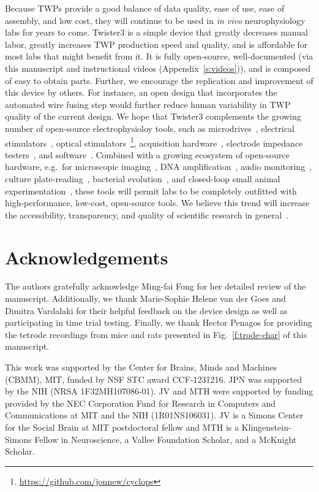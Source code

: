 \documentclass[11pt,a4paper]{article}
\begin{document}
Because TWPs provide a good balance of data quality, ease of use, ease of
assembly, and low cost, they will continue to be used in \textit{in vivo}
neurophysiology labs for years to come. Twister3 is a simple device that
greatly decreases manual labor, greatly increases TWP production speed and
quality, and is affordable for most labs that might benefit from it. It is
fully open-source, well-documented (via this manuscript and instructional
videos (Appendix~\ref{s:videos})), and is composed of easy to obtain parts.
Further, we encourage the replication and improvement of this device by others.
For instance, an open design that incorporates the automated wire fusing step
would further reduce human variability in TWP quality of the current design. We
hope that Twister3 complements the growing number of open-source
electrophysioloy tools, such as
microdrives~\cite{Kloosterman2009,Voigts2013}, electrical
stimulators~\cite{Cermak2019}, optical
stimulators~\cite{Newman2015}\footnote{\url{https://github.com/jonnew/cyclops}},
acquisition hardware~\cite{Siegle2017}, electrode impedance
testers~\cite{Matsumoto2019}, and software~\cite{Newman2012b, Siegle2017,
Lopes2015}. Combined with a growing ecosystem of open-source hardware, e.g.\
for microscopic imaging~\cite{Cai2016,Voigt2019,MIMMS}, DNA
amplification~\cite{OpenPCR}, audio monitoring~\cite{Hill2018}, culture
plate-reading~\cite{Szymula2019}, bacterial evolution~\cite{Takahashi2015}, and
closed-loop small animal experimentation~\cite{Maia2017,Moreira2019}, these
tools will permit labs to be completely outfitted with high-performance,
low-cost, open-source tools. We believe this trend will increase the
accessibility, transparency, and quality of scientific research in
general~\cite{Siegle2015}.

\section*{Acknowledgements}
The authors gratefully acknowledge Ming-fai Fong for her detailed review of the
manuscript. Additionally, we thank Marie-Sophie Helene van der Goes and Dimitra
Vardalaki for their helpful feedback on the device design as well as
participating in time trial testing. Finally, we thank Hector Penagos for
providing the tetrode recordings from mice and rats presented in
Fig.~\ref{f:trode-char} of this manuscript.

This work was supported by the Center for Brains, Minds and Machines (CBMM),
MIT, funded by NSF STC award CCF-1231216. JPN was supported by the NIH (NRSA
1F32MH107086-01). JV and MTH were supported by funding provided by the NEC
Corporation Fund for Research in Computers and Communications at MIT and the
NIH (1R01NS106031). JV is a Simons Center for the Social Brain at MIT
postdoctoral fellow and MTH is a Klingenstein-Simons Fellow in Neuroscience, a
Vallee Foundation Scholar, and a McKnight Scholar.
\end{document}
